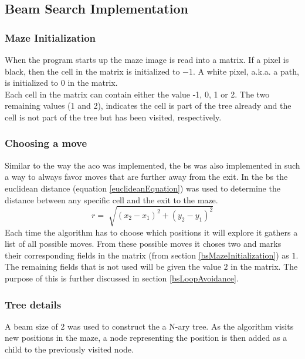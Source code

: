 \documentclass[hidelinks,english,conference]{IEEEtran}
\begin{document}
	\subsection{Beam Search Implementation}
	\subsubsection{Maze Initialization\label{bsMazeInitialization}}
	When the program starts up the maze image is read into a matrix. If a pixel is black, then the cell in the matrix is initialized to $-1$. A white pixel, a.k.a. a path, is initialized to $0$ in the matrix.\\
    
    Each cell in the matrix can contain either the value -1, 0, 1 or 2. The two remaining values (1 and 2), indicates the cell is part of the tree already and the cell is not part of the tree but has been visited, respectively.\\
    
   	\subsubsection{Choosing a move}
	Similar to the way the \gls{aco} was implemented, the \gls{bs} was also implemented in such a way to always favor moves that are further away from the exit. In the \gls{bs} the euclidean distance (equation \ref{euclideanEquation}) was used to determine the distance between any specific cell and the exit to the maze.
    \begin{equation}
   		\label{euclideanEquation}
        r=\sqrt[]{(x_{2} - x_{1})^{2}+(y_{2} - y_{1})^{2}}
    \end{equation}
	Each time the algorithm has to choose which positions it will explore it gathers a list of all possible moves. From these possible moves it choses two and marks their corresponding fields in the matrix (from section \ref{bsMazeInitialization}) as $1$. The remaining fields that is not used will be given the value $2$ in the matrix. The purpose of this is further discussed in section \ref{bsLoopAvoidance}.\\
    
    \subsubsection{Tree details}
	A beam size of 2 was used to construct the a N-ary tree. As the algorithm visits new positions in the maze, a node representing the position is then added as a child to the previously visited node.\\
    
\end{document}

